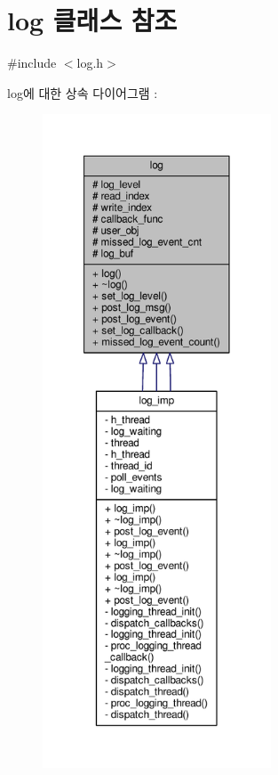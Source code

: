 \hypertarget{classavdecc__lib_1_1log}{}\section{log 클래스 참조}
\label{classavdecc__lib_1_1log}


{\ttfamily \#include $<$log.\+h$>$}



log에 대한 상속 다이어그램 \+: 
\nopagebreak
\begin{figure}[H]
\begin{center}
\leavevmode
\includegraphics[height=550pt]{classavdecc__lib_1_1log__inherit__graph}
\end{center}
\end{figure}


